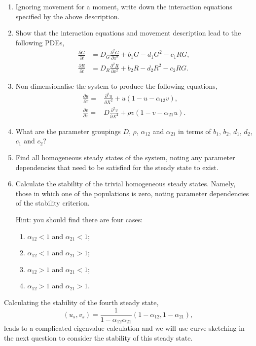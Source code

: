 \documentclass[10pt]{article}
\newcommand{\bb}{\begin{equation}}
\newcommand{\ee}{\end{equation}}
\newcommand{\D}[2]{\frac{\partial #1}{\partial #2}}
\newcommand{\DD}[2]{\frac{\partial^2 #1}{\partial #2^2}}
\newcounter{Counter1}
\begin{document}
\begin{enumerate}
\item Ignoring movement for a moment, write down the interaction equations specified by the above description.


\item Show that the interaction equations and movement description lead to the following PDEs,
\begin{align}
\D{G}{t}&=D_G\DD{G}{x}+b_1G-d_1G^2-c_1RG,\label{G}\\
\D{R}{t}&=D_R\DD{R}{x}+b_2R-d_2R^2-c_2RG.\label{R}
\end{align}

\item Non-dimensionalise the system to produce the following equations,
\begin{align}
\D{u}{\tau}=&\DD{u}{X}+u(1-u-\alpha_{12}v),\label{u}\\
\D{v}{\tau}=&D\DD{v}{X}+\rho v(1-v-\alpha_{21}u).\label{v}
\end{align}


\item What are the parameter groupings $D$, $\rho$, $\alpha_{12}$ and $\alpha_{21}$ in terms of $b_1$, $b_2$, $d_1$, $d_2$, $c_1$ and $c_2$?

\item Find all homogeneous steady states of the system, noting any parameter dependencies that need to be satisfied for the steady state to exist.

\item Calculate the stability of the trivial homogeneous  steady states. Namely, those in which one of the populations is zero, noting parameter dependencies of the stability criterion.

Hint: you should find there are four cases:
\begin{enumerate}
\item $\alpha_{12}<1$ and $\alpha_{21}<1$;
\item $\alpha_{12}<1$ and $\alpha_{21}>1$;
\item $\alpha_{12}>1$ and $\alpha_{21}<1$;
\item $\alpha_{12}>1$ and $\alpha_{21}>1$.
\end{enumerate}
\setcounter{Counter1}{\value{enumi}}
\end{enumerate}


Calculating the stability of the fourth steady state,
\bb
(u_s,v_s)=\frac{1}{1-\alpha_{12}\alpha_{21}}(1-\alpha_{12},1-\alpha_{21}),
\ee
leads to a complicated eigenvalue calculation and we will use curve sketching in the next question to consider the stability of this steady state.
\end{document}
